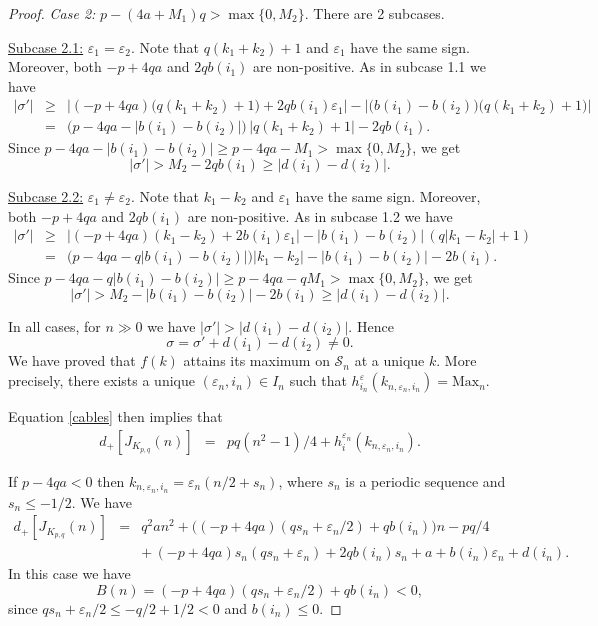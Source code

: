 \documentclass[11pt]{amsart}
\numberwithin{equation}{section}
\theoremstyle{plain}
\theoremstyle{definition}
\def\CS{\mathcal S}
\def\ve{\varepsilon}
\begin{document}
\begin{proof}
\medskip 

\textit{Case 2:} $p- (4a + M_1)q > \max\{0, M_2\}$. There are 2 subcases.

\underline{Subcase 2.1:} $\ve_1 = \ve_2$. Note that $q(k_1+k_2)+1$ and $\ve_1$ have the same sign. Moreover, both $-p+4qa$ and $2qb(i_1)$ are non-positive. As in subcase 1.1 we have 
\begin{eqnarray*}
|\sigma'| &\ge& \big| (-p+4qa) \big( q(k_1+k_2)+1 \big) + 2qb(i_1)\ve_1 \big| - \big| \big( b(i_1) - b(i_2) \big) \big( q(k_1+k_2)+1 \big) \big| \\
&=& \big( p - 4qa - |b(i_1) - b(i_2)| \big) \, |q(k_1+k_2)+1| - 2q b(i_1).
\end{eqnarray*}
Since $p - 4qa - |b(i_1) - b(i_2)|  \ge p - 4qa - M_1 > \max \{0, M_2\}$, we get 
$$|\sigma'| > M_2  -2 q b(i_1) \ge |d(i_1) - d(i_2)|.$$

\underline{Subcase 2.2:} $\ve_1 \not= \ve_2$. Note that $k_1 - k_2$ and $\ve_1$ have the same sign. Moreover, both $-p+4qa$ and $2qb(i_1)$ are non-positive. As in subcase 1.2 we have
\begin{eqnarray*}
|\sigma'| &\ge& \big|  (-p+4qa)(k_1 - k_2) + 2b(i_1)\ve_1 \big| -  | b(i_1) - b(i_2)| \, ( q|k_1 - k_2| + 1) \\
&=& \big( p - 4qa - q |b(i_1) - b(i_2)| \big) |k_1 - k_2| - | b(i_1) - b(i_2)|  - 2 b(i_1).
\end{eqnarray*}
Since $p - 4qa - q |b(i_1) - b(i_2)| \ge p - 4qa - q M_1 > \max\{0, M_2\}$, we get $$|\sigma'| > M_2 -  | b(i_1) - b(i_2)|  -2 b(i_1) \ge |d(i_1) - d(i_2)|.$$

In all cases, for $n \gg 0$ we have $|\sigma'| > |d(i_1)-d(i_2)|.$ Hence $$\sigma = \sigma' + d(i_1) - d(i_2) \not= 0.$$
We have proved that $f(k)$ attains its maximum on $\CS_n$ at a unique $k$. More precisely, there exists a unique $(\ve_n, i_n) \in I_n$ such that $h_{i_n}^{\ve}(k_{n, \ve_n, i_n}) = \text{Max}_n$. 

Equation \eqref{cables} then implies that  
\begin{eqnarray*}
d_+[J_{K_{p,q}}(n)] &=& pq(n^2-1)/4 + h^{\ve_n}_{i}(k_{n,\ve_n,i_n}).
\end{eqnarray*}

If $p - 4qa < 0$ then $k_{n,\ve_n,i_n} = \ve_n (n/2 + s_n)$, where $s_n$ is a periodic sequence and $s_n \le -1/2$. We have
\begin{eqnarray*}
d_+[J_{K_{p,q}}(n)] &=& q^2a n^2 + \big( (-p + 4qa) (q s_n + \ve_n /2) + qb(i_n) \big) n -  pq/4 \\
&& + \, (-p + 4qa)s_n (q s_n + \ve_n) + 2q b(i_n) s_n+  a + b(i_n) \ve_n + d(i_n).
\end{eqnarray*}
In this case we have $$B(n)=(-p + 4qa) (q s_n + \ve_n /2) + qb(i_n) < 0,$$ since $q s_n + \ve_n /2 \le -q/2 + 1/2 <0$ and $b(i_n) \le 0$.


\end{proof}
\end{document}

